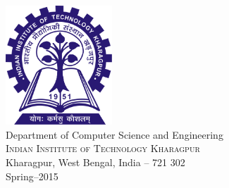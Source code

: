 \begin{titlepage}
\begin{center}
\includegraphics[width=0.30\textwidth]{iitkgp-logo}\\[0.1in]
\Large{Department of Computer Science and Engineering}\\
\normalsize
\textsc{Indian Institute of Technology Kharagpur}\\
Kharagpur, West Bengal, India -- 721 302 \\
\vspace{0.2cm}
Spring--2015

\end{center}

\end{titlepage}
